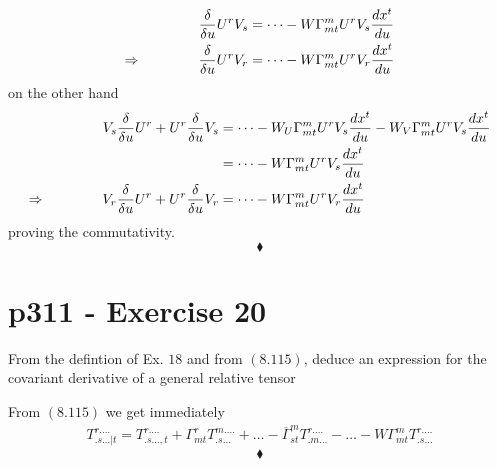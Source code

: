 \begin{align*}
\fdv{}{u}U^rV_s &= \dots -W\Gamma^m_{mt}U^rV_s\dv{x^t}{u}\\
\Rightarrow \spatie \fdv{}{u}U^rV_r &= \dots -W\Gamma^m_{mt}U^rV_r\dv{x^t}{u}\\
\end{align*}
on the other hand 
\begin{align*}
V_s\fdv{}{u}U^r+ U^r\fdv{}{u}V_s &= \dots -W_U\Gamma^m_{mt}U^rV_s\dv{x^t}{u}-W_V\Gamma^m_{mt}U^rV_s\dv{x^t}{u}\\
&= \dots -W\Gamma^m_{mt}U^rV_s\dv{x^t}{u}\\
\Rightarrow \spatie V_r\fdv{}{u}U^r+ U^r\fdv{}{u}V_r &= \dots -W\Gamma^m_{mt}U^rV_r\dv{x^t}{u}
\end{align*}
proving the commutativity.
$$\blacklozenge$$
\newpage




\section{p311 - Exercise 20}
\begin{tcolorbox}
From the defintion of Ex. $18$ and from $\mathbf{(8.115)}$, deduce an expression for the covariant derivative of a general relative tensor 
\end{tcolorbox}
From $\mathbf{(8.115)}$ we get immediately
\begin{align*}
T^{r . \dots}_{.s\dots|t} = T^{r . \dots}_{.s\dots,t}+\Gamma^r_{mt}T^{m . \dots}_{.s\dots}+ \dots -\overline{\Gamma}^m_{st}T^{r . \dots}_{.m\dots}-\dots -W\Gamma^m_{mt}T^{r . \dots}_{.s\dots}
\end{align*}
$$\blacklozenge$$
\newpage



